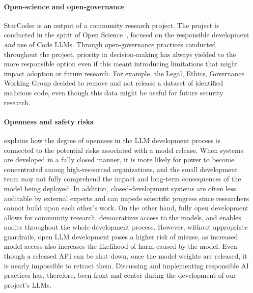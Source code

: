 \documentclass[10pt]{article} %
\begin{document}
\paragraph{Open-science and open-governance} StarCoder is an output of a community research project. The project is conducted in the spirit of Open Science~\citep{open-science}, focused on the responsible development \emph{and} use of Code LLMs. Through open-governance practices conducted throughout the project, priority in decision-making has always yielded to the more responsible option even if this meant introducing limitations that might impact adoption or future research. For example, the Legal, Ethics, Governance Working Group decided to remove and not release a dataset of identified malicious code, even though this data might be useful for future security research.

\paragraph{Openness and safety risks}
\citet{solaiman2023gradient} explains how the degree of openness in the LLM development process is connected to the potential risks associated with a model release. When systems are developed in a fully closed manner, it is more likely for power to become concentrated among high-resourced organizations, and the small development team may not fully comprehend the impact and long-term consequences of the model being deployed. In addition, closed-development systems are often less auditable by external experts and can impede scientific progress since researchers cannot build upon each other's work. On the other hand, fully open development allows for community research, democratizes access to the models, and enables audits throughout the whole development process. However, without appropriate guardrails, open LLM development poses a higher risk of misuse, as increased model access also increases the likelihood of harm caused by the model. Even though a released API can be shut down, once the model weights are released, it is nearly impossible to retract them.  Discussing and implementing responsible AI practices has, therefore, been front and center during the  development of our project's LLMs.

\end{document}
